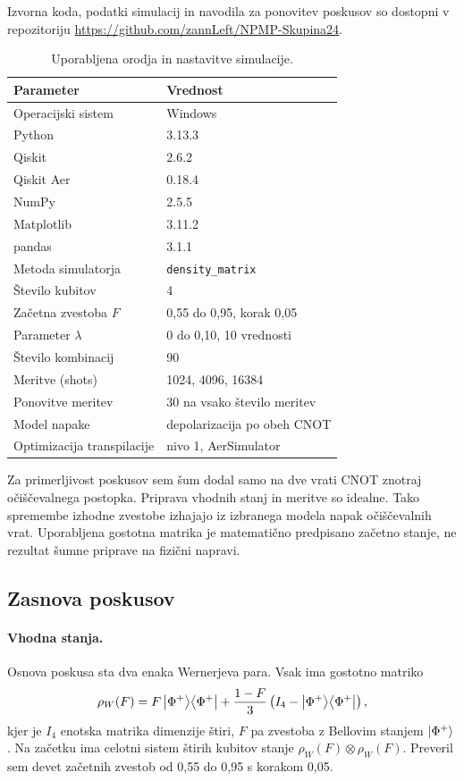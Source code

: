 Izvorna koda, podatki simulacij in navodila za ponovitev poskusov so dostopni v repozitoriju \url{https://github.com/zannLeft/NPMP-Skupina24}.

\begin{table}[htbp]
\centering
\caption{Uporabljena orodja in nastavitve simulacije.}
\label{g24:tab:nastavitve}
\begin{tabular}{ll}
\toprule
Parameter & Vrednost \\
\midrule
Operacijski sistem & Windows \\
Python & 3.13.3 \\
Qiskit & 2.6.2 \\
Qiskit Aer & 0.18.4 \\
NumPy & 2.5.5 \\
Matplotlib & 3.11.2 \\
pandas & 3.1.1 \\
Metoda simulatorja & \texttt{density\_matrix} \\
Število kubitov & 4 \\
Začetna zvestoba $F$ & 0,55 do 0,95, korak 0,05 \\
Parameter $\lambda$ & 0 do 0,10, 10 vrednosti \\
Število kombinacij & 90 \\
Meritve (shots) & 1024, 4096, 16384 \\
Ponovitve meritev & 30 na vsako število meritev \\
Model napake & depolarizacija po obeh CNOT \\
Optimizacija transpilacije & nivo 1, AerSimulator \\
\bottomrule
\end{tabular}
\end{table}

Za primerljivost poskusov sem šum dodal samo na dve vrati CNOT znotraj očiščevalnega postopka. Priprava vhodnih stanj in meritve so idealne. Tako spremembe izhodne zvestobe izhajajo iz izbranega modela napak očiščevalnih vrat. Uporabljena gostotna matrika je matematično predpisano začetno stanje, ne rezultat šumne priprave na fizični napravi.

\subsection{Zasnova poskusov}
\label{g24:sec:poskusi}

\paragraph{Vhodna stanja.}
Osnova poskusa sta dva enaka Wernerjeva para. Vsak ima gostotno matriko
\begin{equation}
 \rho_W(F)=F\ket{\Phi^+}\!\bra{\Phi^+}
 +\frac{1-F}{3}\left(I_4-\ket{\Phi^+}\!\bra{\Phi^+}\right),
 \label{g24:eq:werner}
\end{equation}
kjer je $I_4$ enotska matrika dimenzije štiri, $F$ pa zvestoba z Bellovim stanjem $\ket{\Phi^+}$. Na začetku ima celotni sistem štirih kubitov stanje $\rho_W(F)\otimes\rho_W(F)$. Preveril sem devet začetnih zvestob od 0,55 do 0,95 s korakom 0,05.

